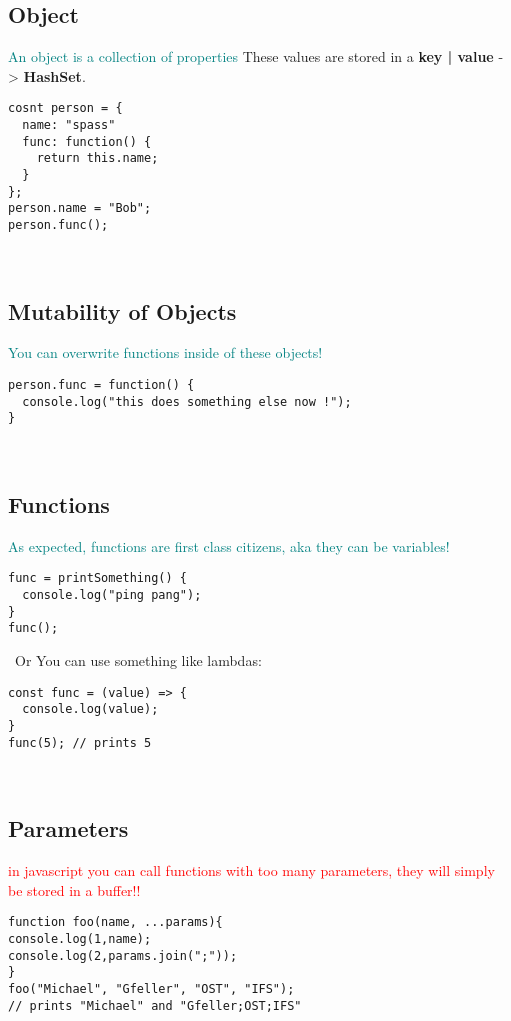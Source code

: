\documentclass[main.tex,fontsize=6pt,paper=a4,paper=landscape,DIV=calc,]{scrartcl}
\begin{document}
\begin{multicols*}{4}
\subsection{Object}  
\textcolor{teal}{An object is a collection of properties}\newline
These values are stored in a \textbf{key | value} -> \textbf{HashSet}.
\begin{lstlisting}
cosnt person = {
  name: "spass"
  func: function() {
    return this.name;
  }
};
person.name = "Bob";
person.func();
\end{lstlisting}
\, \newline

\subsection{Mutability of Objects}  
\textcolor{teal}{You can overwrite functions inside of these objects!}
\begin{lstlisting}
person.func = function() {
  console.log("this does something else now !");
}
\end{lstlisting}
\, \newline

\subsection{Functions} 
\textcolor{teal}{As expected, functions are first class citizens, aka they can be variables!}
\begin{lstlisting}
func = printSomething() {
  console.log("ping pang");
}
func();
\end{lstlisting}
\, \newline
Or You can use something like lambdas:
\begin{lstlisting}
const func = (value) => {
  console.log(value);
}
func(5); // prints 5
\end{lstlisting}
\, \newline

\subsection{Parameters}  
\textcolor{red}{in javascript you can call functions with too many parameters, they will simply be stored in a buffer!!}
\begin{lstlisting}
function foo(name, ...params){
console.log(1,name);
console.log(2,params.join(";"));
}
foo("Michael", "Gfeller", "OST", "IFS");
// prints "Michael" and "Gfeller;OST;IFS"
\end{lstlisting}
\, \newline


\end{multicols*}
\end{document}
